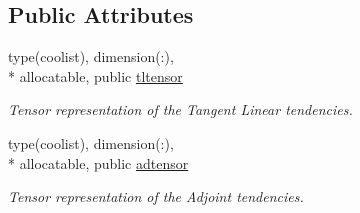 \subsection*{Public Attributes}
\begin{DoxyCompactItemize}
\item 
type(coolist), dimension(\-:), \\*
allocatable, public \hyperlink{classmaooam__tl__ad_a44e20f0d2365c0a256682dbf12c100c8}{tltensor}
\begin{DoxyCompactList}\small\item\em Tensor representation of the Tangent Linear tendencies. \end{DoxyCompactList}\item 
type(coolist), dimension(\-:), \\*
allocatable, public \hyperlink{classmaooam__tl__ad_a7a38eb048440310ff37dbc97c401b00c}{adtensor}
\begin{DoxyCompactList}\small\item\em Tensor representation of the Adjoint tendencies. \end{DoxyCompactList}\end{DoxyCompactItemize}
